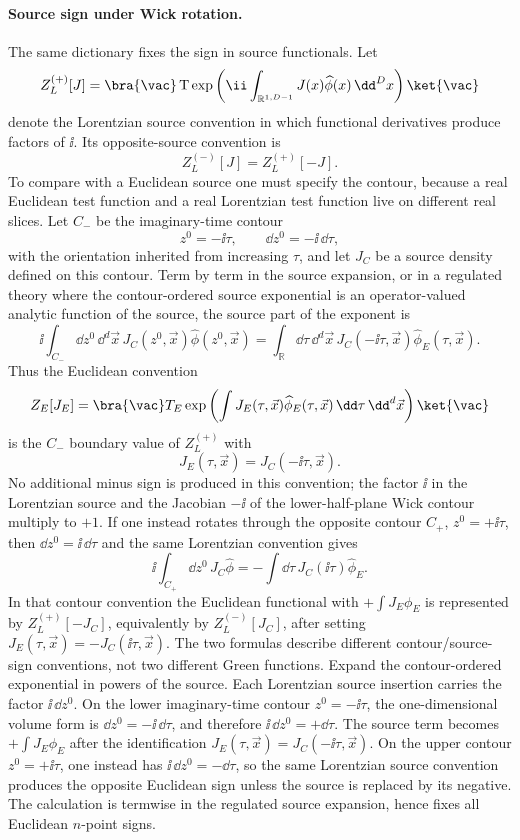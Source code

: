 \paragraph{Source sign under Wick rotation.}
The same dictionary fixes the sign in source functionals.  Let
\[
  Z_L^{(+)}[J]
  =
  \bra{\vac}
  \operatorname T\exp\left(
    \ii\int_{\mathbb R^{1,D-1}}J(x)\widehat\phi(x)\,\dd^Dx
  \right)
  \ket{\vac}
\]
denote the Lorentzian source convention in which functional derivatives
produce factors of \(\ii\).  Its opposite-source convention is
\[
  Z_L^{(-)}[J]=Z_L^{(+)}[-J].
\]
To compare with a Euclidean source one must specify the contour, because a
real Euclidean test function and a real Lorentzian test function live on
different real slices.  Let \(C_-\) be the imaginary-time contour
\[
  z^0=-\ii\tau,\qquad \dd z^0=-\ii\,\dd\tau,
\]
with the orientation inherited from increasing \(\tau\), and let \(J_C\) be a
source density defined on this contour.  Term by term in the source expansion,
or in a regulated theory where the contour-ordered source exponential is an
operator-valued analytic function of the source, the source part of the
exponent is
\[
  \ii\int_{C_-}\dd z^0\,\dd^d\vec x\,
    J_C(z^0,\vec x)\widehat\phi(z^0,\vec x)
  =
  \int_{\mathbb R}\dd\tau\,\dd^d\vec x\,
    J_C(-\ii\tau,\vec x)
    \widehat\phi_E(\tau,\vec x).
\]
Thus the Euclidean convention
\[
  Z_E[J_E]
  =
  \bra{\vac}
  T_E\exp\left(
    \int J_E(\tau,\vec x)
      \widehat\phi_E(\tau,\vec x)\,\dd\tau\,\dd^d\vec x
  \right)
  \ket{\vac}
\]
is the \(C_-\) boundary value of \(Z_L^{(+)}\) with
\[
  J_E(\tau,\vec x)=J_C(-\ii\tau,\vec x).
\]
No additional minus sign is produced in this convention; the factor
\(\ii\) in the Lorentzian source and the Jacobian
\(-\ii\) of the lower-half-plane Wick contour multiply to \(+1\).  If one
instead rotates through the opposite contour \(C_+\), \(z^0=+\ii\tau\), then
\(\dd z^0=\ii\,\dd\tau\) and the same Lorentzian convention gives
\[
  \ii\int_{C_+}\dd z^0\,J_C\widehat\phi
  =
  -\int\dd\tau\,J_C(\ii\tau)\widehat\phi_E .
\]
In that contour convention the Euclidean functional with
\(+\int J_E\phi_E\) is represented by \(Z_L^{(+)}[-J_C]\), equivalently by
\(Z_L^{(-)}[J_C]\), after setting \(J_E(\tau,\vec x)=-J_C(\ii\tau,\vec x)\).
The two formulas describe different contour/source-sign conventions, not two
different Green functions.
Expand the contour-ordered exponential in powers of the source.  Each
Lorentzian source insertion carries the factor \(\ii\,\dd z^0\).  On the
lower imaginary-time contour \(z^0=-\ii\tau\), the one-dimensional volume form
is \(\dd z^0=-\ii\,\dd\tau\), and therefore
\(\ii\,\dd z^0=+\dd\tau\).  The source term becomes \(+\int J_E\phi_E\) after
the identification \(J_E(\tau,\vec x)=J_C(-\ii\tau,\vec x)\).  On the upper
contour \(z^0=+\ii\tau\), one instead has
\(\ii\,\dd z^0=-\dd\tau\), so the same Lorentzian source convention produces
the opposite Euclidean sign unless the source is replaced by its negative.
The calculation is termwise in the regulated source expansion, hence fixes
all Euclidean \(n\)-point signs.

